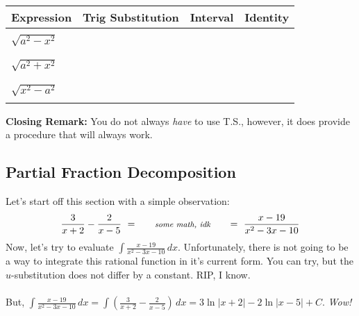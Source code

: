 \documentclass[addpoints, 12pt]{exam}
\newcommand\Tstrut{\rule{0pt}{2.6ex}}         %
\newcommand\Bstrut{\rule[-0.9ex]{0pt}{0pt}}   %
\begin{document}
\vspace{5in}


\begin{longtable}[b]{|C{3.667cm}|C{3.667cm}|C{3.667cm}|C{3.7cm}|}
    \hline
    \textbf{Expression}\Tstrut\Bstrut & \textbf{Trig Substitution}\Tstrut\Bstrut & \textbf{Interval}\Tstrut\Bstrut & \textbf{Identity}\Tstrut\Bstrut \\\hline
    & & & \\
    $\displaystyle\sqrt{a^2-x^2}$\Tstrut\Bstrut & & & \\
    & & & \\\hline
    & & & \\
    $\displaystyle\sqrt{a^2+x^2}$\Tstrut\Bstrut & & & \\
    & & & \\\hline
    & & & \\
    $\displaystyle\sqrt{x^2-a^2}$\Tstrut\Bstrut & & & \\
    & & & \\\hline
    
\end{longtable}

\textbf{Closing Remark:} You do not always \textit{have} to use T.S., however, it does provide a procedure that will always work.


\newpage
{}
\subsection*{Partial Fraction Decomposition}



Let's start off this section with a simple observation:
    \[\displaystyle\frac{3}{x+2}-\frac{2}{x-5}\,\, = \,\, \hspace{.2in}\textit{\footnotesize     some math, idk}\hspace{.2in} \,\,=\,\, \frac{x-19}{x^2-3x-10}\]
Now, let's try to evaluate $\displaystyle\int\frac{x-19}{x^2-3x-10}\,dx$. Unfortunately, there is not going to be a way to integrate this rational function in it's current form. You can try, but the $u$-substitution does not differ by a constant. RIP, I know. \\
\\
But, $\displaystyle\int\frac{x-19}{x^2-3x-10}\,dx=\int\left(\frac{3}{x+2}-\frac{2}{x-5}\right)\,dx=3\ln|x+2|-2\ln|x-5|+C$. \textit{\footnotesize Wow!}

\vspace{.25in}
\end{document}
